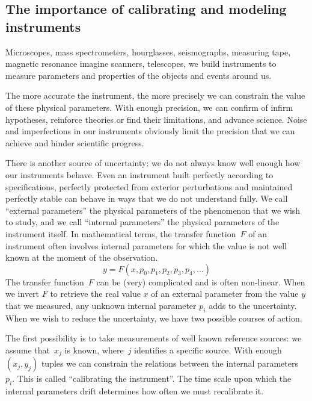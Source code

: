 \subsection{The importance of calibrating and modeling instruments}

Microscopes, mass spectrometers, hourglasses, seismographs, measuring tape, magnetic resonance imagine scanners, telescopes, 
we build instruments to measure parameters and properties of the objects and events around us.

The more accurate the instrument, the more precisely we can constrain the value of these physical parameters.
With enough precision, we can confirm of infirm hypotheses, reinforce theories or find their limitations, and advance science.
Noise and imperfections in our instruments obviously limit the precision that we can achieve and hinder scientific progress.

There is another source of uncertainty: we do not always know well enough how our instruments behave.
Even an instrument built perfectly according to specifications, perfectly protected from exterior perturbations and maintained perfectly stable can behave in ways that we do not understand fully.
We call ``external parameters'' the physical parameters of the phenomenon that we wish to study,
and we call ``internal parameters'' the physical parameters of the instrument itself.
In mathematical terms, the transfer function~$F$ of an instrument often involves internal parameters for which the value is not well known at the moment of the observation.
\begin{equation}
    y = F(x, p_0, p_1, p_2, p_3, p_4, \dots)
\end{equation}
The transfer function~$F$ can be (very) complicated and is often non-linear.
When we invert $F$ to retrieve the real value $x$ of an external parameter from the value $y$ that we measured, any unknown internal parameter $p_i$ adds to the uncertainty.
When we wish to reduce the uncertainty, we have two possible courses of action.

The first possibility is to take measurements of well known reference sources: we assume that~$x_j$ is known, where~$j$ identifies a specific source.
With enough $(x_j, y_j)$ tuples we can constrain the relations between the internal parameters~$p_i$.
This is called ``calibrating the instrument''.
The time scale upon which the internal parameters drift determines how often we must recalibrate it.

